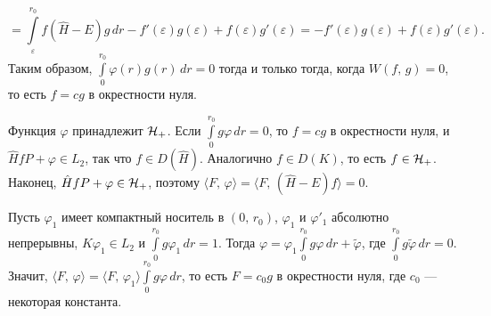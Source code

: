 \documentclass[a4paper
]{article}
\begin{document}
$$=\int \limits_\varepsilon^{r_0}f(\hat H-E)g\, dr-f'(\varepsilon)
g(\varepsilon)+f(\varepsilon)g'(\varepsilon)=-f'(\varepsilon)g(\varepsilon)+
f(\varepsilon)g'(\varepsilon).$$ Таким образом, $\int \limits_0^{r_0}
\varphi(r)g(r)\, dr=0$ тогда и только тогда, когда $W(f, \, g)=0$,
то есть $f=cg$ в окрестности нуля. \par
Функция $\varphi$ принадлежит ${\cal H}_+$. Если $\int \limits_0^{r_0}
g\varphi\, dr=0$, то $f=cg$ в окрестности нуля, и $\hat HfP+\varphi\in
L_2$, так что $f\in D(\hat H)$. Аналогично $f\in D(K)$, то есть
$f\in {\cal H}_+$. Наконец, $\hat HfP+\varphi\in {\cal H}_+$, поэтому
$\langle F, \, \varphi\rangle=\langle F, \, (\hat H-E)f\rangle=0$. \par
Пусть $\varphi_1$ имеет компактный носитель в $(0, \, r_0)$,
$\varphi_1$ и $\varphi'_1$ абсолютно непрерывны, $K\varphi_1\in L_2$ и $\int
\limits_0^{r_0}g\varphi_1\, dr=1$. Тогда $\varphi=\varphi_1\int
\limits_0^{r_0}g\varphi\, dr+\tilde \varphi$, где $\int \limits_0^{r_0}
g\tilde \varphi\, dr=0$. Значит, $\langle F, \, \varphi\rangle=\langle F, \,
\varphi_1\rangle\int \limits_0^{r_0}g\varphi\, dr$, то есть $F=c_0g$
в окрестности нуля, где $c_0$ --- некоторая константа.
\end{document}
